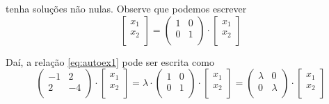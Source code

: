 tenha soluções não nulas. Observe que podemos escrever
$$\begin{bmatrix}x_1\\x_2\\ \end{bmatrix}=\begin{pmatrix}1 & 0\\0 & 1\\ \end{pmatrix}\cdot\begin{bmatrix}x_1\\x_2\\ \end{bmatrix}$$

Daí, a relação \eqref{eq:autoex1} pode ser escrita como
$$\begin{pmatrix}-1 & 2\\2 & -4\\ \end{pmatrix}\cdot\begin{bmatrix}x_1\\x_2\\ \end{bmatrix}=\lambda\cdot\begin{pmatrix}1 & 0\\0 & 1\\ \end{pmatrix}\cdot\begin{bmatrix}x_1\\x_2\\ \end{bmatrix}=\begin{pmatrix}\lambda & 0\\0 & \lambda\\ \end{pmatrix}\cdot\begin{bmatrix}x_1\\x_2\\ \end{bmatrix}$$


